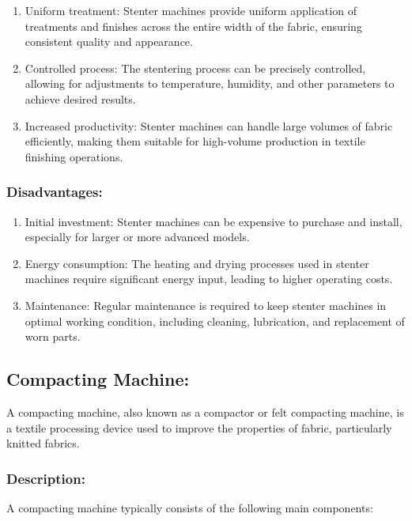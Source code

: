 \begin{enumerate}
\item
  Uniform treatment: Stenter machines provide uniform application of
  treatments and finishes across the entire width of the fabric,
  ensuring consistent quality and appearance.
\item
  Controlled process: The stentering process can be precisely
  controlled, allowing for adjustments to temperature, humidity, and
  other parameters to achieve desired results.
\item
  Increased productivity: Stenter machines can handle large volumes of
  fabric efficiently, making them suitable for high-volume production in
  textile finishing operations.
\end{enumerate}

\subsubsection{Disadvantages:}

\begin{enumerate}
\item
  Initial investment: Stenter machines can be expensive to purchase and
  install, especially for larger or more advanced models.
\item
  Energy consumption: The heating and drying processes used in stenter
  machines require significant energy input, leading to higher operating
  costs.
\item
  Maintenance: Regular maintenance is required to keep stenter machines
  in optimal working condition, including cleaning, lubrication, and
  replacement of worn parts.
\end{enumerate}

\subsection{Compacting Machine:}


A compacting machine, also known as a compactor or felt compacting
machine, is a textile processing device used to improve the properties
of fabric, particularly knitted fabrics.


\subsubsection{Description:}


A compacting machine typically consists of the following main
components:


